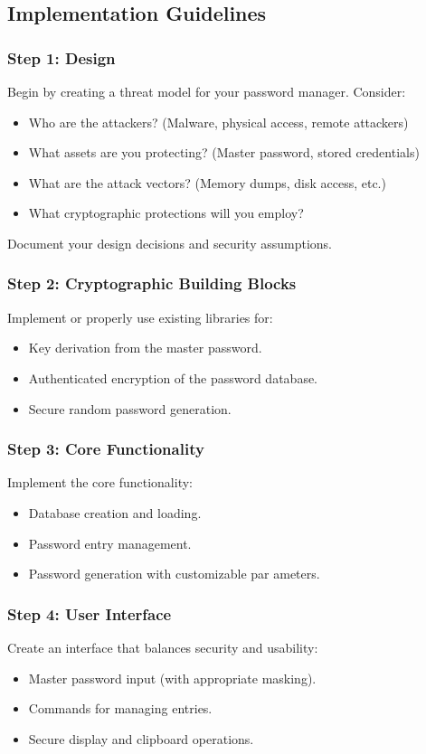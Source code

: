 \documentclass[10pt,a4paper,american]{article}
\begin{document}
\subsection*{Implementation Guidelines}

\subsubsection*{Step 1: Design}
Begin by creating a threat model for your password manager. Consider:
\begin{itemize}
	\item Who are the attackers? (Malware, physical access, remote attackers)
	\item What assets are you protecting? (Master password, stored credentials)
	\item What are the attack vectors? (Memory dumps, disk access, etc.)
	\item What cryptographic protections will you employ?
\end{itemize}

Document your design decisions and security assumptions.

\subsubsection*{Step 2: Cryptographic Building Blocks}
Implement or properly use existing libraries for:
\begin{itemize}
	\item Key derivation from the master password.
	\item Authenticated encryption of the password database.
	\item Secure random password generation.
\end{itemize}

\subsubsection*{Step 3: Core Functionality}
Implement the core functionality:
\begin{itemize}
	\item Database creation and loading.
	\item Password entry management.
	\item Password generation with customizable par ameters.
\end{itemize}

\subsubsection*{Step 4: User Interface}
Create an interface that balances security and usability:
\begin{itemize}
	\item Master password input (with appropriate masking).
	\item Commands for managing entries.
	\item Secure display and clipboard operations.
\end{itemize}
\end{document}
